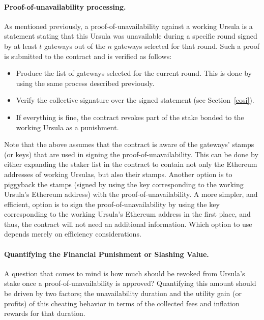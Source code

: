 \paragraph{\bf Proof-of-unavailability processing.} 
As mentioned previously, a proof-of-unavailability against a working Ursula is a statement stating that this Ursula was unavailable during a specific round signed by at least $t$ gateways out of the $n$ gateways selected for that round. Such a proof is submitted to the \stakeescrow contract and is verified as follows:
\begin{itemize}
\item Produce the list of gateways selected for the current round. This is done by using the same process described previously.

\item Verify the collective signature over the signed statement (see Section~\ref{cosi}).

\item If everything is fine, the \stakeescrow contract revokes part of the stake bonded to the working Ursula as a punishment.
\end{itemize}


Note that the above assumes that the \stakeescrow contract is aware of the gateways' stamps (or keys) that are used in signing the proof-of-unavailability. This can be done by either expanding the staker list in the contract to contain not only the Ethereum addresses of working Ursulas, but also their stamps. Another option is to piggyback the stamps (signed by using the key corresponding to the working Ursula's Ethereum address) with the proof-of-unavailability. A more simpler, and efficient, option is to sign the proof-of-unavailability by using the key corresponding to the working Ursula's Ethereum address in the first place, and thus, the \stakeescrow contract will not need an additional information. Which option to use depends merely on efficiency considerations.


\paragraph{\bf Quantifying the Financial Punishment or Slashing Value.}
A question that comes to mind is how much should be revoked from Ursula's stake once a proof-of-unavailability is approved? Quantifying this amount should be driven by two factors; the unavailability duration and the utility gain (or profits) of this cheating behavior in terms of the collected fees and inflation rewards for that duration.


